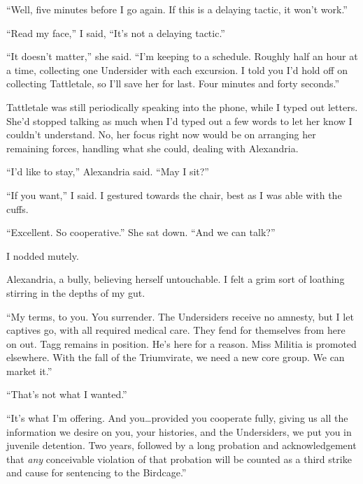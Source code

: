 ``Well, five minutes before I go again.  If this is a delaying tactic, it won't work.''



``Read my face,'' I said, ``It's not a delaying tactic.''



``It doesn't matter,'' she said.  ``I'm keeping to a schedule.  Roughly half an hour at a time, collecting one Undersider with each excursion.  I told you I'd hold off on collecting Tattletale, so I'll save her for last.  Four minutes and forty seconds.''



Tattletale was still periodically speaking into the phone, while I typed out letters.  She'd stopped talking as much when I'd typed out a few words to let her know I couldn't understand.  No, her focus right now would be on arranging her remaining forces, handling what she could, dealing with Alexandria.



``I'd like to stay,'' Alexandria said.  ``May I sit?''



``If you want,'' I said.  I gestured towards the chair, best as I was able with the cuffs.



``Excellent.  So cooperative.''  She sat down.  ``And we can talk?''



I nodded mutely.



Alexandria, a bully, believing herself untouchable.  I felt a grim sort of loathing stirring in the depths of my gut.



``My terms, to you.  You surrender.  The Undersiders receive no amnesty, but I let captives go, with all required medical care.  They fend for themselves from here on out.  Tagg remains in position.  He's here for a reason.  Miss Militia is promoted elsewhere.  With the fall of the Triumvirate, we need a new core group.  We can market it.''



``That's not what I wanted.''



``It's what I'm offering.  And you\ldots provided you cooperate fully, giving us all the information we desire on you, your histories, and the Undersiders, we put you in juvenile detention.  Two years, followed by a long probation and acknowledgement that \emph{any} conceivable violation of that probation will be counted as a third strike and cause for sentencing to the Birdcage.''




